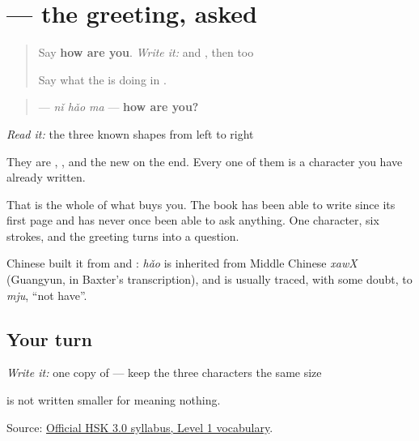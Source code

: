 \section[\texorpdfstring{\zh{你好吗} (nǐ hǎo ma)}{你好吗 (nǐ hǎo ma)}]{ — the greeting, asked}

\label{lesson:ZH-C19-nihaoma}



\begin{quote}
Say \textbf{how are you}. \emph{Write it:}  and , then \textbf{} too

Say what the  is doing in \textbf{}.
\end{quote}

\begin{cousinweb}
\begin{quote}
\textbf{} — \emph{nǐ hǎo ma} — \textbf{how are you?}
\end{quote}

\emph{Read it:} the three known shapes from left to right

They are , , and the new  on the end. Every one of them is a character you have already written.

That is the whole of what  buys you. The book has been able to write  since its first page and has never once been able to ask anything. One character, six strokes, and the greeting turns into a question.

Chinese built it from  and : \emph{hǎo} is inherited from Middle Chinese \emph{xawX} (Guangyun, in Baxter's transcription), and  is usually traced, with some doubt, to \emph{mju}, \textquotedblleft{}not have\textquotedblright{}.
\end{cousinweb}

\subsection*{Your turn}
\emph{Write it:} one copy of \textbf{} — keep the three characters the same size

 is not written smaller for meaning nothing.

\begin{tcolorbox}[breakable,colback=teal!4,colframe=teal!35!black,title={Before you move on}]
Source: \href{https://hsk.cn-bj.ufileos.com/3.0/\%E6\%96\%B0\%E7\%89\%88HSK\%E8\%80\%83\%E8\%AF\%95\%E5\%A4\%A7\%E7\%BA\%B21219.pdf}{Official HSK 3.0 syllabus, Level 1 vocabulary}.
\end{tcolorbox}
